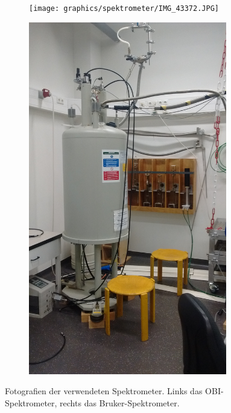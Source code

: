 \begin{figure}
	\centering
	\begin{subfigure}{.35\textwidth}
		\centering
		\texttt{[image: graphics/spektrometer/IMG\_43372.JPG]}
		\caption{ }
		\label{fig:exp:OBI}
	\end{subfigure}%
	\begin{subfigure}{.35\textwidth}
		\centering
		\includegraphics[width=0.95\textwidth]{graphics/spektrometer/IMG_20180419_160711175.jpg}
		\caption{ }
		\label{fig:exp:bruker}
	\end{subfigure}
	\caption{Fotografien der verwendeten Spektrometer. Links das OBI-Spektrometer, rechts das Bruker-Spektrometer.}
	\label{fig:exp:spektrometer}
\end{figure}


